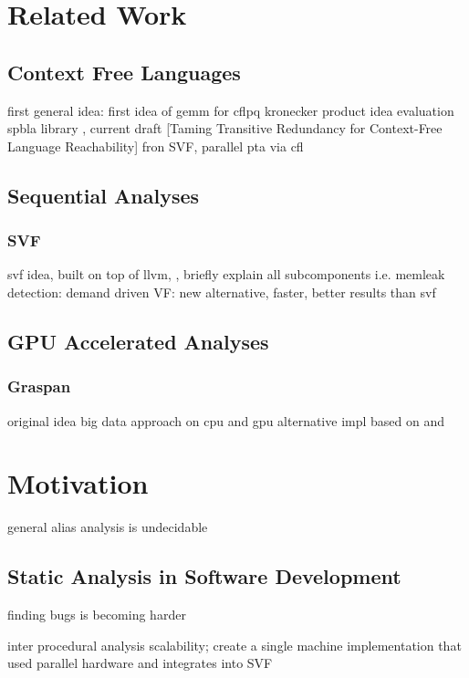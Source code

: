 \section{Related Work}
\subsection{Context Free Languages}
first general idea: \autocite{reps1998program} first idea of gemm for cflpq \autocite{azimov2018context} kronecker product idea \autocite{orachev2020context} evaluation \autocite{mishin2019evaluation} spbla library \autocite{orachev2021spbla}, current draft [Taming Transitive Redundancy for Context-Free Language Reachability] fron SVF, parallel pta via cfl \autocite{su2014parallel}
\subsection{Sequential Analyses}
\subsubsection{SVF}
svf idea, built on top of llvm, \autocite{sui2016svf}, briefly explain all subcomponents i.e. memleak detection: \autocite{sui2014detecting} demand driven VF: \autocite{sui2018value} new alternative, faster, better results than svf \autocite{shi2018pinpoint}
\subsection{GPU Accelerated Analyses}
\subsubsection{Graspan}
original idea \autocite{zheng2008demand} big data approach on cpu \autocite{wang2017graspan} and gpu \autocite{zuo2021systemizing} alternative impl \autocite{gu2020towards} based on \autocite{mendez2012gpu} and \autocite{mendez2010parallel}
\section{Motivation}
general alias analysis is undecidable
\subsection{Static Analysis in Software Development}
finding bugs is becoming harder

inter procedural analysis scalability; create a single machine implementation that used parallel hardware and integrates into SVF


